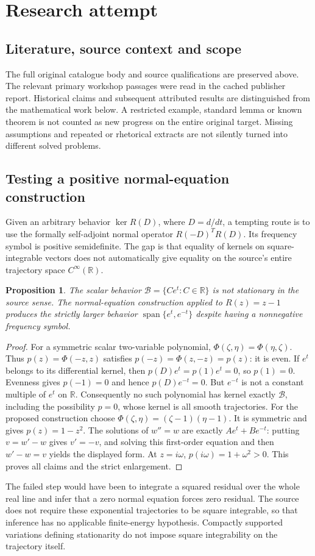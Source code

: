 \documentclass[11pt]{article}
\newtheorem{proposition}{Proposition}
\begin{document}
\section{Research attempt}
\subsection{Literature, source context and scope}
The full original catalogue body and source qualifications are preserved above. The relevant primary workshop passages were read in the cached publisher report. Historical claims and subsequent attributed results are distinguished from the mathematical work below. A restricted example, standard lemma or known theorem is not counted as new progress on the entire original target. Missing assumptions and repeated or rhetorical extracts are not silently turned into different solved problems.

\subsection{Testing a positive normal-equation construction}
Given an arbitrary behavior $\ker R(D)$, where $D=d/dt$, a tempting route is to use the formally self-adjoint normal operator $R(-D)^T R(D)$. Its frequency symbol is positive semidefinite. The gap is that equality of kernels on square-integrable vectors does not automatically give equality on the source's entire trajectory space $C^\infty(\mathbb R)$.
\begin{proposition}
The scalar behavior $\mathcal B=\{Ce^t:C\in\mathbb R\}$ is not stationary in the source sense. The normal-equation construction applied to $R(z)=z-1$ produces the strictly larger behavior $\operatorname{span}\{e^t,e^{-t}\}$ despite having a nonnegative frequency symbol.
\end{proposition}
\begin{proof}
For a symmetric scalar two-variable polynomial, $\Phi(\zeta,\eta)=\Phi(\eta,\zeta)$. Thus $p(z)=\Phi(-z,z)$ satisfies $p(-z)=\Phi(z,-z)=p(z)$: it is even. If $e^t$ belongs to its differential kernel, then $p(D)e^t=p(1)e^t=0$, so $p(1)=0$. Evenness gives $p(-1)=0$ and hence $p(D)e^{-t}=0$. But $e^{-t}$ is not a constant multiple of $e^t$ on $\mathbb R$. Consequently no such polynomial has kernel exactly $\mathcal B$, including the possibility $p=0$, whose kernel is all smooth trajectories.
For the proposed construction choose $\Phi(\zeta,\eta)=(\zeta-1)(\eta-1)$. It is symmetric and gives $p(z)=1-z^2$. The solutions of $w''=w$ are exactly $Ae^t+Be^{-t}$: putting $v=w'-w$ gives $v'=-v$, and solving this first-order equation and then $w'-w=v$ yields the displayed form. At $z=i\omega$, $p(i\omega)=1+\omega^2>0$. This proves all claims and the strict enlargement.
\end{proof}
The failed step would have been to integrate a squared residual over the whole real line and infer that a zero normal equation forces zero residual. The source does not require these exponential trajectories to be square integrable, so that inference has no applicable finite-energy hypothesis. Compactly supported variations defining stationarity do not impose square integrability on the trajectory itself.
\end{document}
